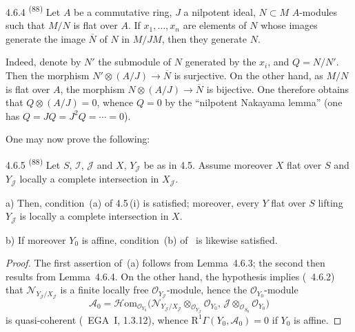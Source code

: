 \begin{lemma}{4.6.4}
\label{III.4.6.4}
\textsuperscript{(88)}
Let \(A\) be a commutative ring, \(J\) a nilpotent ideal, \(N\subset M\) \(A\)-modules such that \(M/N\) is flat over \(A\). If \(x_{1},\ldots,x_{n}\) are elements of \(N\) whose images generate the image \(\overline{N}\) of \(N\) in \(M/JM\), then they generate \(N\).
\end{lemma}

Indeed, denote by \(N'\) the submodule of \(N\) generated by the \(x_{i}\), and \(Q=N/N'\). Then the morphism \(N'\otimes(A/J)\to\overline{N}\) is surjective. On the other hand, as \(M/N\) is flat over \(A\), the morphism \(N\otimes(A/J)\to\overline{N}\) is bijective. One therefore obtains that \(Q\otimes(A/J)=0\), whence \(Q=0\) by the ``nilpotent Nakayama lemma'' (one has \(Q=JQ=J^{2}Q=\cdots=0\)).

One may now prove the following:

\begin{proposition}{4.6.5}
\label{III.4.6.5}
\textsuperscript{(88)}
Let \(S\), \(\mathcal{I}\), \(\mathcal{J}\) and \(X\), \(Y_{\mathcal{J}}\) be as in 4.5. Assume moreover \(X\) flat over \(S\) and \(Y_{\mathcal{J}}\) locally a complete intersection in \(X_{\mathcal{J}}\).

a) Then, condition~(a) of 4.5\,(i) is satisfied; moreover, every \(Y\) flat over \(S\) lifting \(Y_{\mathcal{J}}\) is locally a complete intersection in \(X\).

b) If moreover \(Y_{0}\) is affine, condition~(b) of \loccit\ is likewise satisfied.
\end{proposition}

\begin{proof}
The first assertion of~(a) follows from Lemma~4.6.3; the second then results from Lemma~4.6.4. On the other hand, the hypothesis implies (\cf~4.6.2) that \(\mathcal{N}_{Y_{\mathcal{J}}/X_{\mathcal{J}}}\) is a finite locally free \(\mathcal{O}_{Y_{\mathcal{J}}}\)-module, hence the \(\mathcal{O}_{Y_{0}}\)-module
\[
\mathcal{A}_{0}
=
\mathcal{H}\mathrm{om}_{\mathcal{O}_{Y_{0}}}\bigl(\mathcal{N}_{Y_{\mathcal{J}}/X_{\mathcal{J}}}\otimes_{\mathcal{O}_{Y_{\mathcal{J}}}}\mathcal{O}_{Y_{0}},\,\mathcal{J}\otimes_{\mathcal{O}_{S_{0}}}\mathcal{O}_{Y_{0}}\bigr)
\]
is quasi-coherent (\cf\ EGA~I, 1.3.12), whence \(\mathrm{R}^{1}\Gamma(Y_{0},\mathcal{A}_{0})=0\) if \(Y_{0}\) is affine.
\end{proof}


